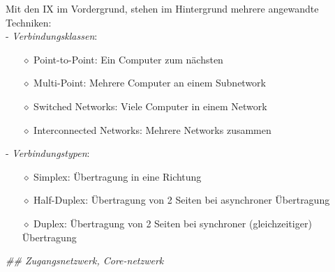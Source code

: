 \documentclass[11pt]{article}
\begin{document}
    Mit den IX im Vordergrund, stehen im Hintergrund mehrere angewandte Techniken:\\
    - \emph{Verbindungsklassen}:
    \begin{enumerate}
        \item[$\diamond$] Point-to-Point: Ein Computer zum nächsten
        \item[$\diamond$] Multi-Point: Mehrere Computer an einem Subnetwork
        \item[$\diamond$] Switched Networks: Viele Computer in einem Network
        \item[$\diamond$] Interconnected Networks: Mehrere Networks zusammen
    \end{enumerate}
    - \emph{Verbindungstypen}:
    \begin{enumerate}
        \item[$\diamond$] Simplex: Übertragung in eine Richtung
        \item[$\diamond$] Half-Duplex: Übertragung von 2 Seiten bei asynchroner Übertragung
        \item[$\diamond$] Duplex: Übertragung von 2 Seiten bei synchroner (gleichzeitiger) Übertragung
    \end{enumerate}

    \emph{## Zugangsnetzwerk, Core-netzwerk}
\end{document}
